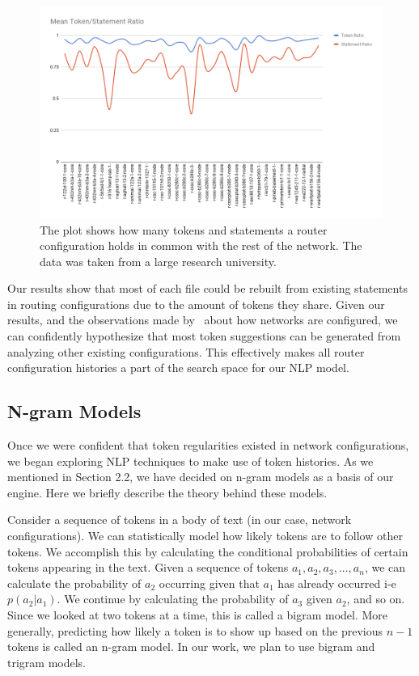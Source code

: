 \begin{figure}[H]
	\centering
	\includegraphics[width=\textwidth]{chart.png}
	\caption{The plot shows how many tokens and statements a router configuration holds in common with the rest of the network. The data was taken from a large research university.}
\end{figure}

Our results show that most of each file could be rebuilt from existing statements in routing configurations due to the amount of tokens they share. Given our results, and the observations made by~\cite{complexity} about how networks are configured, we can confidently hypothesize that most token suggestions can be generated from analyzing other existing configurations. This effectively makes all router configuration histories a part of the search space for our NLP model. 

\subsection{N-gram Models}

Once we were confident that token regularities existed in network configurations, we began exploring NLP techniques to make use of token histories. As we mentioned in Section 2.2, we have decided on n-gram models as a basis of our engine. Here we briefly describe the theory behind these models. 

Consider a sequence of tokens in a body of text (in our case, network configurations). We can statistically model how likely tokens are to follow other tokens. We accomplish this by calculating the conditional probabilities of certain tokens appearing in the text. Given a sequence of tokens $a_1,a_2,a_3,...,a_n$, we can calculate the probability of $a_2$ occurring given that $a_1$ has already occurred i-e $p(a_2 | a_1)$. We continue by calculating the probability of $a_3$ given $a_2$, and so on. Since we looked at two tokens at a time, this is called a bigram model. More generally, predicting how likely a token is to show up based on the previous $n-1$ tokens is called an n-gram model. In our work, we plan to use bigram and trigram models.

